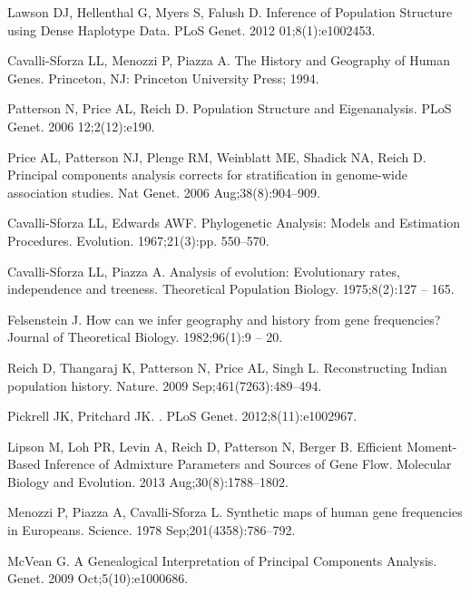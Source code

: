\documentclass[10pt,letterpaper]{article}
\begin{document}
\begin{thebibliography}{80}
Lawson DJ, Hellenthal G, Myers S, Falush D.
\newblock Inference of Population Structure using Dense Haplotype Data.
\newblock PLoS Genet. 2012 01;8(1):e1002453.

Cavalli-Sforza LL, Menozzi P, Piazza A.
\newblock The History and Geography of Human Genes.
\newblock Princeton, NJ: Princeton University Press; 1994.

Patterson N, Price AL, Reich D.
\newblock Population Structure and Eigenanalysis.
\newblock PLoS Genet. 2006 12;2(12):e190.

Price AL, Patterson NJ, Plenge RM, Weinblatt ME, Shadick NA, Reich D.
\newblock Principal components analysis corrects for stratification in
  genome-wide association studies.
\newblock Nat Genet. 2006 Aug;38(8):904--909.

Cavalli-Sforza LL, Edwards AWF.
\newblock Phylogenetic Analysis: Models and Estimation Procedures.
\newblock Evolution. 1967;21(3):pp. 550--570.

Cavalli-Sforza LL, Piazza A.
\newblock Analysis of evolution: Evolutionary rates, independence and treeness.
\newblock Theoretical Population Biology. 1975;8(2):127 -- 165.

Felsenstein J.
\newblock How can we infer geography and history from gene frequencies?
\newblock Journal of Theoretical Biology. 1982;96(1):9 -- 20.

Reich D, Thangaraj K, Patterson N, Price AL, Singh L.
\newblock Reconstructing {Indian} population history.
\newblock Nature. 2009 Sep;461(7263):489--494.

Pickrell JK, Pritchard JK.
.
\newblock PLoS Genet. 2012;8(11):e1002967.

Lipson M, Loh PR, Levin A, Reich D, Patterson N, Berger B.
\newblock Efficient Moment-Based Inference of Admixture Parameters and Sources
  of Gene Flow.
\newblock Molecular Biology and Evolution. 2013 Aug;30(8):1788--1802.

Menozzi P, Piazza A, Cavalli-Sforza L.
\newblock Synthetic maps of human gene frequencies in {Europeans}.
\newblock Science. 1978 Sep;201(4358):786--792.

McVean G.
\newblock A Genealogical Interpretation of Principal Components Analysis.
 Genet. 2009 Oct;5(10):e1000686.


\end{thebibliography}
\end{document}

